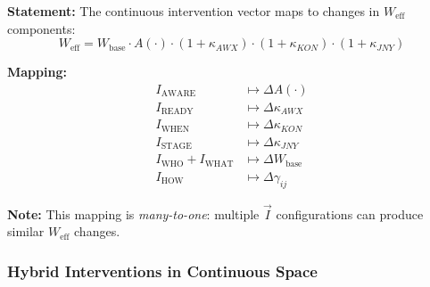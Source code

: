 \begin{tcolorbox}[colback=gray!5!white, colframe=gray!75!black,
    title=\textbf{Theorem HHH-T1b: Mapping from Continuous Space to $W_{\text{eff}}$}]

\textbf{Statement:} The continuous intervention vector maps to changes in $W_{\text{eff}}$ components:
\begin{equation}
W_{\text{eff}} = W_{\text{base}} \cdot A(\cdot) \cdot (1 + \kappa_{AWX}) \cdot (1 + \kappa_{KON}) \cdot (1 + \kappa_{JNY})
\label{eq:hhh-weff}
\end{equation}

\textbf{Mapping:}
\begin{align}
I_{\text{AWARE}} &\mapsto \Delta A(\cdot) \\
I_{\text{READY}} &\mapsto \Delta \kappa_{AWX} \\
I_{\text{WHEN}} &\mapsto \Delta \kappa_{KON} \\
I_{\text{STAGE}} &\mapsto \Delta \kappa_{JNY} \\
I_{\text{WHO}} + I_{\text{WHAT}} &\mapsto \Delta W_{\text{base}} \\
I_{\text{HOW}} &\mapsto \Delta \gamma_{ij}
\end{align}

\textbf{Note:} This mapping is \textit{many-to-one}: multiple $\vec{I}$ configurations can produce similar $W_{\text{eff}}$ changes.
\end{tcolorbox}


\subsubsection{Hybrid Interventions in Continuous Space}


